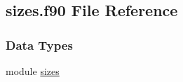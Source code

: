 \hypertarget{sizes_8f90}{\subsection{sizes.\-f90 File Reference}
\label{sizes_8f90}
}
\subsubsection*{Data Types}
\begin{DoxyCompactItemize}
\item 
module \hyperlink{classsizes}{sizes}
\end{DoxyCompactItemize}

